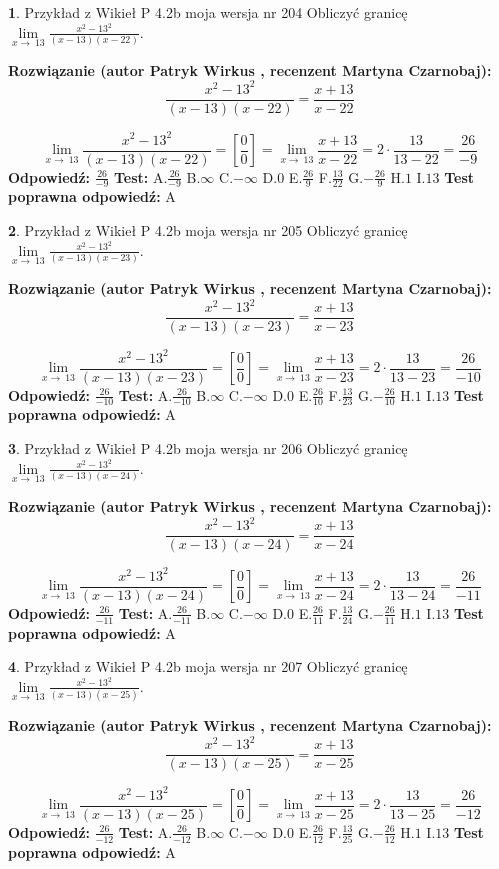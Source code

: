 \documentclass[12pt, a4paper]{article}
\theoremstyle{definition} %
\newtheorem{zad}{}
\newcommand{\zadStart}[1]{\begin{zad}#1\newline}
\newcommand{\zadStop}{\end{zad}}
\newcommand{\rozwStart}[2]{\noindent \textbf{Rozwiązanie (autor #1 , recenzent #2): }\newline}
\newcommand{\rozwStop}{\newline}
\newcommand{\odpStart}{\noindent \textbf{Odpowiedź:}\newline}
\newcommand{\odpStop}{\newline}
\newcommand{\testStart}{\noindent \textbf{Test:}\newline}
\newcommand{\testStop}{\newline}
\newcommand{\kluczStart}{\noindent \textbf{Test poprawna odpowiedź:}\newline}
\newcommand{\kluczStop}{\newline}
\begin{document}
\zadStart{Przykład z Wikieł P 4.2b moja wersja nr 204}
Obliczyć granicę $\lim\limits_{x\to\ 13}\frac{x^{2}-13^{2}}{(x-13)(x-22)}$.
\zadStop
\rozwStart{Patryk Wirkus}{Martyna Czarnobaj}
$$\frac{x^{2}-13^{2}}{(x-13)(x-22)}=\frac{x+13}{x-22}$$

$$\lim\limits_{x\to\ 13}\frac{x^{2}-13^{2}}{(x-13)(x-22)}=[\frac{0}{0}]=\lim\limits_{x\to\ 13}\frac{x+13}{x-22}=2 \cdot \frac{13}{13-22} = \frac{26}{-9}$$
\rozwStop
\odpStart
$\frac{26}{-9}$
\odpStop
\testStart
A.$\frac{26}{-9}$
B.$\infty$
C.$-\infty$
D.$0$
E.$\frac{26}{9}$
F.$\frac{13}{22}$
G.$-\frac{26}{9}$
H.$1$
I.$13$
\testStop
\kluczStart
A
\kluczStop



\zadStart{Przykład z Wikieł P 4.2b moja wersja nr 205}
Obliczyć granicę $\lim\limits_{x\to\ 13}\frac{x^{2}-13^{2}}{(x-13)(x-23)}$.
\zadStop
\rozwStart{Patryk Wirkus}{Martyna Czarnobaj}
$$\frac{x^{2}-13^{2}}{(x-13)(x-23)}=\frac{x+13}{x-23}$$

$$\lim\limits_{x\to\ 13}\frac{x^{2}-13^{2}}{(x-13)(x-23)}=[\frac{0}{0}]=\lim\limits_{x\to\ 13}\frac{x+13}{x-23}=2 \cdot \frac{13}{13-23} = \frac{26}{-10}$$
\rozwStop
\odpStart
$\frac{26}{-10}$
\odpStop
\testStart
A.$\frac{26}{-10}$
B.$\infty$
C.$-\infty$
D.$0$
E.$\frac{26}{10}$
F.$\frac{13}{23}$
G.$-\frac{26}{10}$
H.$1$
I.$13$
\testStop
\kluczStart
A
\kluczStop



\zadStart{Przykład z Wikieł P 4.2b moja wersja nr 206}
Obliczyć granicę $\lim\limits_{x\to\ 13}\frac{x^{2}-13^{2}}{(x-13)(x-24)}$.
\zadStop
\rozwStart{Patryk Wirkus}{Martyna Czarnobaj}
$$\frac{x^{2}-13^{2}}{(x-13)(x-24)}=\frac{x+13}{x-24}$$

$$\lim\limits_{x\to\ 13}\frac{x^{2}-13^{2}}{(x-13)(x-24)}=[\frac{0}{0}]=\lim\limits_{x\to\ 13}\frac{x+13}{x-24}=2 \cdot \frac{13}{13-24} = \frac{26}{-11}$$
\rozwStop
\odpStart
$\frac{26}{-11}$
\odpStop
\testStart
A.$\frac{26}{-11}$
B.$\infty$
C.$-\infty$
D.$0$
E.$\frac{26}{11}$
F.$\frac{13}{24}$
G.$-\frac{26}{11}$
H.$1$
I.$13$
\testStop
\kluczStart
A
\kluczStop



\zadStart{Przykład z Wikieł P 4.2b moja wersja nr 207}
Obliczyć granicę $\lim\limits_{x\to\ 13}\frac{x^{2}-13^{2}}{(x-13)(x-25)}$.
\zadStop
\rozwStart{Patryk Wirkus}{Martyna Czarnobaj}
$$\frac{x^{2}-13^{2}}{(x-13)(x-25)}=\frac{x+13}{x-25}$$

$$\lim\limits_{x\to\ 13}\frac{x^{2}-13^{2}}{(x-13)(x-25)}=[\frac{0}{0}]=\lim\limits_{x\to\ 13}\frac{x+13}{x-25}=2 \cdot \frac{13}{13-25} = \frac{26}{-12}$$
\rozwStop
\odpStart
$\frac{26}{-12}$
\odpStop
\testStart
A.$\frac{26}{-12}$
B.$\infty$
C.$-\infty$
D.$0$
E.$\frac{26}{12}$
F.$\frac{13}{25}$
G.$-\frac{26}{12}$
H.$1$
I.$13$
\testStop
\kluczStart
A
\kluczStop
\end{document}
